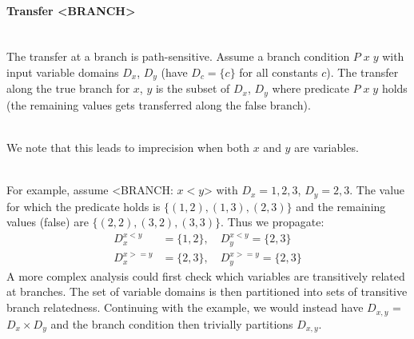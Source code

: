 \documentclass[a4paper]{article}
\newcommand{\NL}[0]{ \hfill\\\noindent }
\begin{document}
\paragraph{Transfer <BRANCH>}\NL
The transfer at a branch is path-sensitive. Assume a branch condition $P\;x\;y$ with input variable domains $D_x$, $D_y$ (have $D_c = \{c\}$ for all constants $c$).  The transfer along the true branch for $x$, $y$ is the subset of $D_x$, $D_y$ where predicate $P\;x\;y$ holds (the remaining values gets transferred along the false branch).

\NL
We note that this leads to imprecision when both $x$ and $y$ are variables. 

\NL
For example, assume <BRANCH: $x < y$> with $D_x = {1,2,3}$, $D_y = {2,3}$. The value for which the predicate holds is $\{(1,2), (1,3), (2,3)\}$ and the remaining values (false) are $\{(2,2), (3,2), (3,3)\}$. Thus we propagate:
\begin{align*}
D_x^{x < y} &= \{1, 2\} , \quad D_y^{x < y}  = \{2,3\} \\
D_x^{x >= y} &= \{2,3\} , \quad D_y^{x >= y} = \{2,3\} 
\end{align*}
\noindent
A more complex analysis could first check which variables are transitively related at branches. The set of variable domains is then partitioned into sets of transitive branch relatedness. Continuing with the example, we would instead have $D_{x,y}$ = $D_x \times D_y$ and the branch condition then trivially partitions $D_{x,y}$. 




%
%
%
%
%
\end{document}
